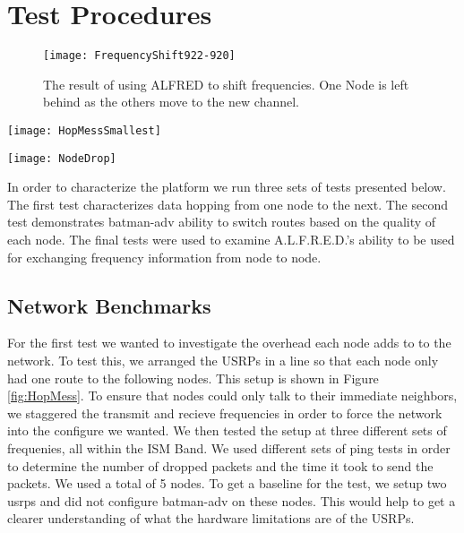 \section{Test Procedures}

\begin{figure}
	\centering
	\texttt{[image: FrequencyShift922-920]}
	\caption{The result of using ALFRED to shift frequencies. One Node is left behind as the others move to the new channel.}
	\label{fig:freqshift}
\end{figure}


\begin{figure*}
	\centering
	\texttt{[image: HopMessSmallest]}
	\caption{The configuration used for the first set of tests.}
	\label{fig:HopMess}
\end{figure*}

\begin{figure*}
	\centering
	\texttt{[image: NodeDrop]}
	\caption{The configuration used for the second set of tests.}
	\label{fig:NodeDrop}
\end{figure*}

In order to characterize the platform we run three sets of tests presented below. The first test characterizes data hopping from one node to the next. The second test demonstrates batman-adv ability to switch routes based on the quality of each node. The final tests were used to examine A.L.F.R.E.D.'s ability to be used for exchanging frequency information from node to node. 

\subsection{Network Benchmarks}



For the first test we wanted to investigate the overhead each node adds to to the network. To test this, we arranged the USRPs in a line so that each node only had one route to the following nodes. This setup is shown in Figure \ref{fig:HopMess}. To ensure that nodes could only talk to their immediate neighbors, we staggered the transmit and recieve frequencies in order to force the network into the configure we wanted. We then tested the setup at three different sets of frequenies, all within the ISM Band. We used different sets of ping tests in order to determine the number of dropped packets and the time it took to send the packets. We used a total of 5 nodes. To get a baseline for the test, we setup two usrps and did not configure batman-adv on these nodes. This would help to get a clearer understanding of what the hardware limitations are of the USRPs. 


